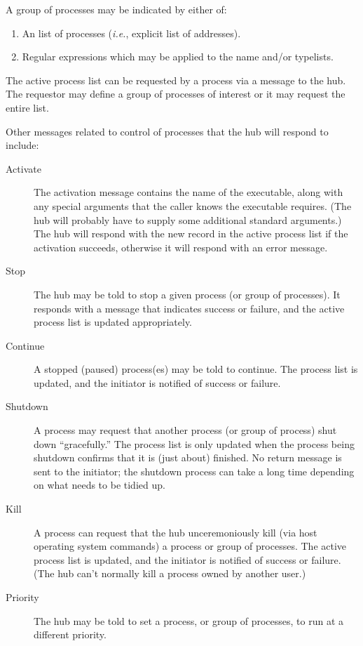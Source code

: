A group of processes may be indicated by either of:
\begin{enumerate}
\item An list of processes ({\em i.e.}, explicit list of  addresses).
\item Regular expressions which may be applied to the name and/or typelists.
\end{enumerate} 

The active process list can be requested by a process via a message to
the hub. The requestor may define a group of processes of interest or
it may request the entire list.

Other messages related to control of processes that the hub will
respond to include:

\begin{description}
\item[Activate] 
        The activation message contains the name of the executable,
        along with any special arguments that the caller knows the
        executable requires. (The hub will probably have to supply
        some additional standard arguments.) The hub will respond with
        the new record in the active process list if the activation
        succeeds, otherwise it will respond with an error message.
\item[Stop]
        The hub may be told to stop a given process (or group of
        processes). It responds with a message that indicates success
        or failure, and the active process list is updated
        appropriately.
\item[Continue]
        A stopped (paused) process(es) may be told to continue. The
        process list is updated, and the initiator is notified of
        success or failure.
\item[Shutdown]
        A process may request that another process (or group of
        process) shut down ``gracefully.'' The process list is only
        updated when the process being shutdown confirms that it is
        (just about) finished. No return message is sent to the
        initiator; the shutdown process can take a long time depending
        on what needs to be tidied up.
\item[Kill]
        A process can request that the hub unceremoniously kill (via
        host operating system commands) a process or group of
        processes. The active process list is updated, and the
        initiator is notified of success or failure. (The hub can't
        normally kill a process owned by another user.)
\item[Priority]
        The hub may be told to set a process, or group of processes,
        to run at a different priority.
\end{description}

